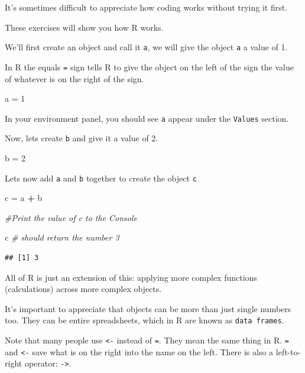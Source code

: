 \documentclass[]{book}
\makeatletter
\newenvironment{Shaded}{\begin{snugshade}}{\end{snugshade}}
\newcommand{\DecValTok}[1]{\textcolor[rgb]{0.00,0.00,0.81}{#1}}
\newcommand{\StringTok}[1]{\textcolor[rgb]{0.31,0.60,0.02}{#1}}
\newcommand{\CommentTok}[1]{\textcolor[rgb]{0.56,0.35,0.01}{\textit{#1}}}
\newcommand{\OperatorTok}[1]{\textcolor[rgb]{0.81,0.36,0.00}{\textbf{#1}}}
\newcommand{\NormalTok}[1]{#1}
\newenvironment{kframe}{%
\medskip{}
\setlength{\fboxsep}{.8em}
 \def\at@end@of@kframe{}%
 \ifinner\ifhmode%
  \def\at@end@of@kframe{\end{minipage}}%
  \begin{minipage}{\columnwidth}%
 \fi\fi%
 \def\FrameCommand##1{\hskip\@totalleftmargin \hskip-\fboxsep
 \colorbox{shadecolor}{##1}\hskip-\fboxsep
     \hskip-\linewidth \hskip-\@totalleftmargin \hskip\columnwidth}%
 \MakeFramed {\advance\hsize-\width
   \@totalleftmargin\z@ \linewidth\hsize
   \@setminipage}}%
 {\par\unskip\endMakeFramed%
 \at@end@of@kframe}
\renewenvironment{Shaded}{\begin{kframe}}{\end{kframe}}
\makeatother
\begin{document}
It's sometimes difficult to appreciate how coding works without trying
it first.

These exercises will show you how R works.

We'll first create an object and call it \texttt{a}, we will give the
object \texttt{a} a value of 1.

In R the equals \texttt{=} sign tells R to give the object on the left
of the sign the value of whatever is on the right of the sign.

\begin{Shaded}
\begin{Highlighting}[]
\NormalTok{a =}\StringTok{ }\DecValTok{1}
\end{Highlighting}
\end{Shaded}

In your environment panel, you should see \texttt{a} appear under the
\texttt{Values} section.

Now, lets create \texttt{b} and give it a value of 2.

\begin{Shaded}
\begin{Highlighting}[]
\NormalTok{b =}\StringTok{ }\DecValTok{2}
\end{Highlighting}
\end{Shaded}

Lets now add \texttt{a} and \texttt{b} together to create the object
\texttt{c}

\begin{Shaded}
\begin{Highlighting}[]
\NormalTok{c =}\StringTok{ }\NormalTok{a }\OperatorTok{+}\StringTok{ }\NormalTok{b }

\CommentTok{#Print the value of c to the Console}

\NormalTok{c }\CommentTok{# should return the number 3}
\end{Highlighting}
\end{Shaded}

\begin{verbatim}
## [1] 3
\end{verbatim}

All of R is just an extension of this: applying more complex functions
(calculations) across more complex objects.

It's important to appreciate that objects can be more than just single
numbers too. They can be entire spreadsheets, which in R are known as
\texttt{data\ frames}.

Note that many people use \texttt{\textless{}-} instead of \texttt{=}.
They mean the same thing in R. \texttt{=} and \texttt{\textless{}-} save
what is on the right into the name on the left. There is also a
left-to-right operator: \texttt{-\textgreater{}}.
\end{document}

